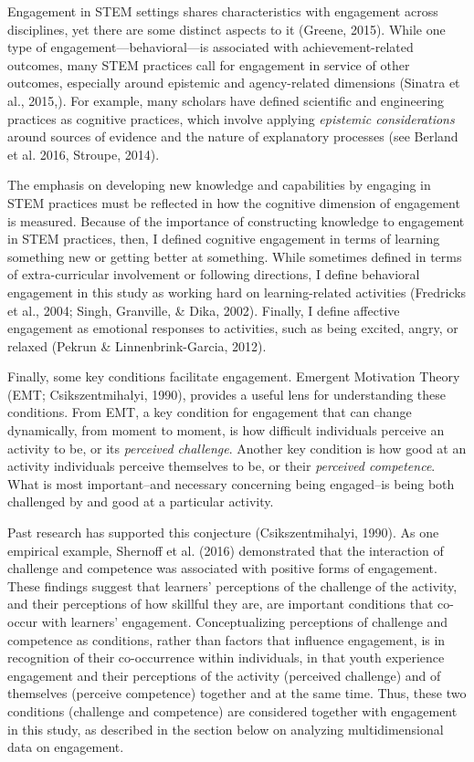 \documentclass[]{msu-thesis}
\theoremstyle{definition}
\theoremstyle{definition}
\theoremstyle{definition}
\theoremstyle{remark}
\begin{document}
Engagement in STEM settings shares characteristics with engagement
across disciplines, yet there are some distinct aspects to it (Greene,
2015). While one type of engagement---behavioral---is associated with
achievement-related outcomes, many STEM practices call for engagement in
service of other outcomes, especially around epistemic and
agency-related dimensions (Sinatra et al., 2015,). For example, many
scholars have defined scientific and engineering practices as cognitive
practices, which involve applying \emph{epistemic considerations} around
sources of evidence and the nature of explanatory processes (see Berland
et al. 2016, Stroupe, 2014).

The emphasis on developing new knowledge and capabilities by engaging in
STEM practices must be reflected in how the cognitive dimension of
engagement is measured. Because of the importance of constructing
knowledge to engagement in STEM practices, then, I defined cognitive
engagement in terms of learning something new or getting better at
something. While sometimes defined in terms of extra-curricular
involvement or following directions, I define behavioral engagement in
this study as working hard on learning-related activities (Fredricks et
al., 2004; Singh, Granville, \& Dika, 2002). Finally, I define affective
engagement as emotional responses to activities, such as being excited,
angry, or relaxed (Pekrun \& Linnenbrink-Garcia, 2012).

Finally, some key conditions facilitate engagement. Emergent Motivation
Theory (EMT; Csikszentmihalyi, 1990), provides a useful lens for
understanding these conditions. From EMT, a key condition for engagement
that can change dynamically, from moment to moment, is how difficult
individuals perceive an activity to be, or its \emph{perceived
challenge}. Another key condition is how good at an activity individuals
perceive themselves to be, or their \emph{perceived competence}. What is
most important--and necessary concerning being engaged--is being both
challenged by and good at a particular activity.

Past research has supported this conjecture (Csikszentmihalyi, 1990). As
one empirical example, Shernoff et al. (2016) demonstrated that the
interaction of challenge and competence was associated with positive
forms of engagement. These findings suggest that learners' perceptions
of the challenge of the activity, and their perceptions of how skillful
they are, are important conditions that co-occur with learners'
engagement. Conceptualizing perceptions of challenge and competence as
conditions, rather than factors that influence engagement, is in
recognition of their co-occurrence within individuals, in that youth
experience engagement and their perceptions of the activity (perceived
challenge) and of themselves (perceive competence) together and at the
same time. Thus, these two conditions (challenge and competence) are
considered together with engagement in this study, as described in the
section below on analyzing multidimensional data on engagement.
\end{document}
